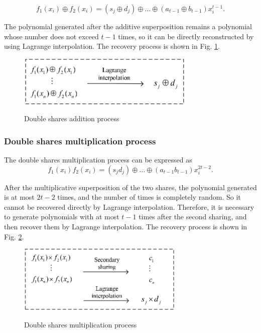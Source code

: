 \begin{equation}
f_{1}\left(x_{i}\right) \oplus f_{2}\left(x_{i}\right)=\left(s_{j} \oplus d_{j}\right) \oplus \ldots \oplus\left(a_{t-1} \oplus b_{t-1}\right) x_{i}^{t-1}.
\end{equation}

The polynomial generated after the additive superposition remains a polynomial whose number does not exceed $t-1$ times, so it can be directly reconstructed by using Lagrange interpolation. The recovery process is shown in Fig. \ref{fig02}.

\begin{figure}[!htb]
	\begin{center}
		\includegraphics[width=8.5cm]{DAP.eps}\\
		\caption{Double shares addition process}
		\label{fig02}
		\vspace{-2.0em}
	\end{center}
\end{figure}
\subsubsection{Double shares multiplication process}		

The double shares multiplication process can be expressed as
\begin{equation}
f_{1}\left(x_{i}\right) f_{2}\left(x_{i}\right)=\left(s_{j} d_{j}\right) \oplus \ldots \oplus\left(a_{t-1} b_{t-1}\right) x_{i}^{2 t-2}.
\end{equation}

After the multiplicative superposition of the two shares, the polynomial generated is at most $2t-2$ times, and the number of times is completely random. So it cannot be recovered directly by Lagrange interpolation. Therefore, it is necessary to generate polynomials with at most $t-1$ times after the second sharing, and then recover them by Lagrange interpolation. The recovery process is shown in Fig. \ref{fig03}.

\begin{figure}[!htb]
	\begin{center}
		\includegraphics[width=8cm]{DMP.eps}\\
		\caption{Double shares multiplication process}
		\label{fig03}
		\vspace{-2.0em}
	\end{center}
\end{figure}

